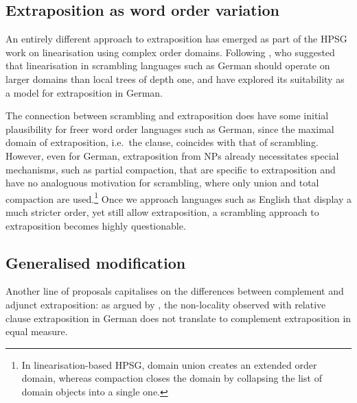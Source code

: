 \documentclass[output=paper
                ,modfonts
                ,nonflat
	        ,collection
	        ,collectionchapter
	        ,collectiontoclongg
 	        ,biblatex
                ,babelshorthands
                ,newtxmath
                ,draftmode
                ,colorlinks, citecolor=brown
]{./langsci/langscibook}
\begin{document}
{\subsection{Extraposition as word order variation}

An entirely different approach to extraposition has emerged as part of
the HPSG work on linearisation using complex order domains. Following
\citet{Reape:94}, who suggested that linearisation in scrambling
languages such as German should operate on larger domains than local
trees of depth one, \citet{Kathol:95b,kathol_a00} and \citet{KP95a}
have explored its suitability as a model for extraposition in German.


The connection between scrambling and extraposition does have some
initial plausibility for freer word order languages such as German,
since the maximal domain of extraposition, i.e.\ the clause, coincides
with that of scrambling. However, even for German, extraposition from
NPs already necessitates special mechanisms, such as partial
compaction, that are specific to extraposition and have no analoguous
motivation for scrambling, where only union and total compaction are
used.\footnote{In linearisation-based HPSG, domain union creates an
  extended order domain, whereas compaction closes the domain by
  collapsing the list of domain objects into a single one.} Once we
approach languages such as English that display a much stricter order,
yet still allow extraposition, a scrambling approach to extraposition
becomes highly questionable.


\subsection{Generalised modification}

Another line of proposals capitalises on the differences between
complement and adjunct extraposition: as argued by
\citet{kiss_t02nllt}\addpages, the non-locality observed with relative clause
extraposition in German does not translate to complement extraposition
in equal measure.

\begin{exe}
  \ex \label{ex:ExtraNP}
  \begin{xlist}


\end{xlist}
\end{exe}}
\end{document}

